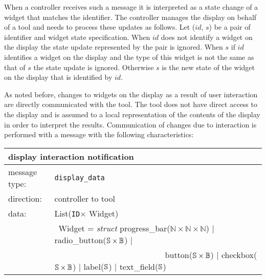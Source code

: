 \documentclass{article}
\newcommand{\msg}[1]{\texttt{#1}}
\newcommand{\String}{\ensuremath \mathbb{S}\xspace}
\newcommand{\Id}{\texttt{ID}\xspace}
\begin{document}
   \noindent When a controller receives such a message it is interpreted as a
   state change of a widget that matches the identifier. The controller manages
   the display on behalf of a tool and needs to process these updates as
   follows.  Let ($id$, $s$) be a pair of identifier and widget state
   specification. When $id$ does not identify a widget on the display the state
   update represented by the pair is ignored. When $s$ if $id$ identifies a
   widget on the display and the type of this widget is not the same as that of
   $s$ the state update is ignored.  Otherwise $s$ is the new state of the
   widget on the display that is identified by $id$.
   
   \pagebreak

   As noted before, changes to widgets on the display as a result of user
   interaction are directly communicated with the tool. The tool does not have
   direct access to the display and is assumed to a local representation of the
   contents of the display in order to interpret the results. Communication of
   changes due to interaction is performed with a message with the following
   characteristics:

   \begin{table}[H]
    \begin{center}
     \begin{tabular}{|ll|}
      \hline
       \multicolumn{2}{|l|}{\textbf{display interaction notification}} \\
      \hline
       message type:   & \msg{display\_data} \\
      \hline
       direction:      & controller to tool \\
      \hline
       data:           & List(\Id $\times$ Widget) \\
                       & \ Widget = \textit{struct} progress\_bar($\mathbb{N} \times \mathbb{N} \times \mathbb{N}$) $|$
                                                    radio\_button($\String \times \mathbb{B}$) $|$ \\
                       & \ \ \ \ \ \ \ \ \ \ \ \ \ \ \ \ \ \ \ \ \ \ \ \ \ \ \
                                                    button($\String \times \mathbb{B}$) $|$
                                                    checkbox($\String \times \mathbb{B}$) $|$
                                                    label($\String$) $|$
                                                    text\_field($\String$) \\
      \hline
     \end{tabular}
    \end{center}
   \vspace{-0.0cm}
   \end{table}
\end{document}
